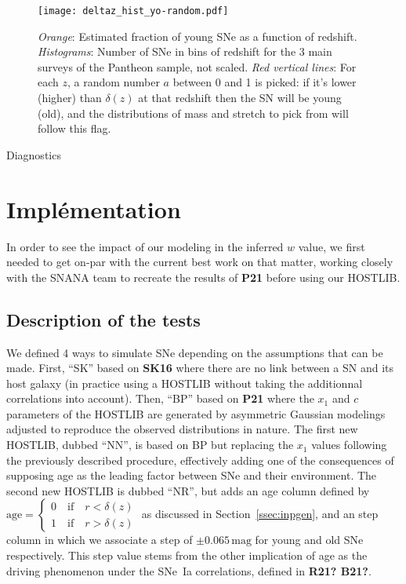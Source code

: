 \documentclass[../main/main.tex]{subfiles}
\begin{document}
\begin{figure}[]
    \centering
    \texttt{[image: deltaz\_hist\_yo-random.pdf]}
    \caption{\textit{Orange}: Estimated fraction of young SNe as a function of
        redshift. \textit{Histograms}: Number of SNe in bins of redshift for the
        3 main surveys of the Pantheon sample, not scaled. \textit{Red vertical
        lines}: For each $z$, a random number $a$ between 0 and 1 is picked: if
    it's lower (higher) than $\delta(z)$ at that redshift then the SN will be
young (old), and the distributions of mass and stretch to pick from will follow
this flag.}
    \label{fig:deltaz}
\end{figure}

Diagnostics

\section{Implémentation}\label{sec:snaimpl} 
In order to see the impact of our modeling in the inferred $w$ value, we first
needed to get on-par with the current best work on that matter, working closely
with the SNANA team to recreate the results of \textbf{P21} before using our
HOSTLIB.

\subsection{Description of the tests}\label{ssec:kinds}
We defined 4 ways to simulate SNe depending on the assumptions that can be made.
First, ``SK'' based on \textbf{SK16} where there are no link between a SN and
its host galaxy (in practice using a HOSTLIB without taking the additionnal
correlations into account). Then, ``BP'' based on \textbf{P21} where the $x_1$
and $c$ parameters of the HOSTLIB are generated by asymmetric Gaussian modelings
adjusted to reproduce the observed distributions in nature. The first new
HOSTLIB, dubbed ``NN'', is based on BP but replacing the $x_1$ values following
the previously described procedure, effectively adding one of the consequences
of supposing age as the leading factor between SNe and their environment. The
second new HOSTLIB is dubbed ``NR'', but adds an age column defined by
$\mathrm{age} = \left\{
    \begin{array}{l}
        0 \quad \mathrm{if} \quad r < \delta(z)\\
        1 \quad \mathrm{if} \quad r > \delta(z)
    \end{array}
\right.$ as discussed in Section~\ref{ssec:inpgen}, and an step column in which
we associate a step of $\pm0.065\,\mathrm{mag}$ for young and old SNe
respectively. This step value stems from the other implication of age as the
driving phenomenon under the SNe~Ia correlations, defined in \textbf{R21? B21?}.
\end{document}
